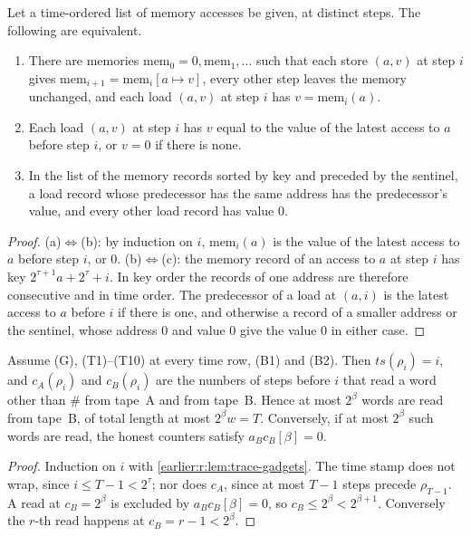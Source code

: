\begin{lemma}\label{earlier:r:lem:trace-memory}
Let a time-ordered list of memory accesses be given, at distinct steps.
The following are equivalent.
\begin{enumerate}[label=(\alph*)]
\item There are memories \(\mathrm{mem}_0=0,\mathrm{mem}_1,\ldots\) such
that each store \((a,v)\) at step \(i\) gives
\(\mathrm{mem}_{i+1}=\mathrm{mem}_i[a\mapsto v]\), every other step
leaves the memory unchanged, and each load \((a,v)\) at step \(i\) has
\(v=\mathrm{mem}_i(a)\).
\item Each load \((a,v)\) at step \(i\) has \(v\) equal to the value of
the latest access to \(a\) before step \(i\), or \(v=0\) if there is
none.
\item In the list of the memory records sorted by key and preceded by
the sentinel, a load record whose predecessor has the same address has
the predecessor's value, and every other load record has value \(0\).
\end{enumerate}
\end{lemma}
\begin{proof}
(a)\(\Leftrightarrow\)(b): by induction on \(i\), \(\mathrm{mem}_i(a)\) is
the value of the latest access to \(a\) before step \(i\), or \(0\).
(b)\(\Leftrightarrow\)(c): the memory record of an access to \(a\) at
step \(i\) has key \(2^{\tau+1}a+2^\tau+i\). In key order the records of
one address are therefore consecutive and in time order. The
predecessor of a load at \((a,i)\) is the latest access to \(a\) before
\(i\) if there is one, and otherwise a record of a smaller address or
the sentinel, whose address \(0\) and value \(0\) give the value \(0\)
in either case.
\end{proof}

\begin{lemma}\label{earlier:r:lem:trace-counters}
Assume (G), (T1)--(T10) at every time row, (B1) and (B2). Then
\(\mathit{ts}(\rho_i)=i\), and \(c_A(\rho_i)\) and \(c_B(\rho_i)\) are
the numbers of steps before \(i\) that read a word other than \(\#\)
from tape~A and from tape~B. Hence at most \(2^\beta\) words are read
from tape~B, of total length at most \(2^\beta w=T\). Conversely, if at
most \(2^\beta\) such words are read, the honest counters satisfy
\(a_Bc_B[\beta]=0\).
\end{lemma}
\begin{proof}
Induction on \(i\) with \cref{earlier:r:lem:trace-gadgets}. The time stamp does
not wrap, since \(i\le T-1<2^\tau\); nor does \(c_A\), since at most
\(T-1\) steps precede \(\rho_{T-1}\). A read at \(c_B=2^\beta\) is
excluded by \(a_Bc_B[\beta]=0\), so \(c_B\le2^\beta<2^{\beta+1}\).
Conversely the \(r\)-th read happens at \(c_B=r-1<2^\beta\).
\end{proof}

